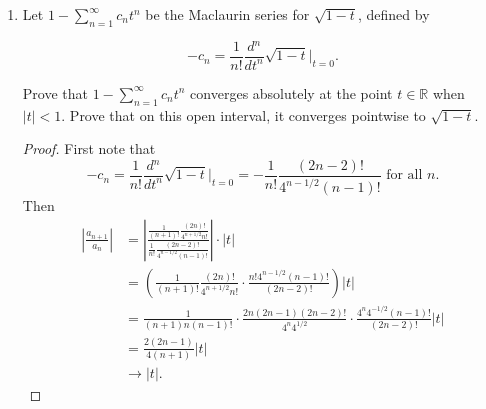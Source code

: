 \documentclass[11pt,oneside,english]{amsart}
\theoremstyle{definition}
\newcommand{\dd}[2]{\frac{d{#1}}{d{#2}}}
\newcommand{\MC}[1]{\mathcal{#1}}
\newcommand{\MB}[1]{\mathbb{#1}}
\def\<#1>{\mathinner{\langle#1\rangle}}
\begin{document}
\begin{enumerate}
\begin{proof}
Let $\<\pi_\gamma(x_{i(j)})>_{j\in J}\subseteq X_\gamma$ be a net. Since $X_\gamma$ is compact, by Theorem 4.29, the net $\<\pi_\gamma(x_{i(j)})>_{j\in J}$ has a subnet $\<\pi_\gamma(x_{i(j(k))})>_{k\in K\subseteq J}$ that converges to some point $p_\gamma$. Now, let $q$ be the unique element of
\[
\prod_{\alpha\in\overline{B}\cup\{\gamma\}}X_\alpha
\]
that extends both $\bar{p}$ and $p_\gamma$, i.e. the unique element such that $q\geq \bar{p},p_\gamma$. Then the net $\<\pi_{\overline{B}\cup\{\gamma\}}(x_{i(j(k))})>_{k\in K}$ converges to $q$. But this means that $q$ is a cluster point of the net $\<\pi_{\overline{B}\cup\{\gamma\}}(x_i)>$, i.e. $q\in\MC{P}$ and $q\geq\bar{p}$, but $q\neq\bar{p}$, a contradiction. Therefore, our assumption that $\overline{B}\neq A$ was fallacious and it must be the case that $\overline{B}=A$. Consequently, $\bar{p}$ is a cluster point of our original net $\<x_i>$, and since $\<x_i>$ was chosen arbitrarily, we have shown that any net in $X$ has a cluster point. By Proposition 4.29 again, this means that $X$ is compact, and we are done.
\end{proof}


\item Let $\displaystyle 1-\sum_{n=1}^\infty c_nt^n$ be the Maclaurin series for $\sqrt{1-t}$, defined by

\[
-c_n=\frac{1}{n!}\dd{^n}{t^n}\sqrt{1-t}\Bigg|_{t=0}.
\]

Prove that $\displaystyle 1-\sum_{n=1}^\infty c_nt^n$ converges absolutely at the point $t\in\MB{R}$ when $|t|<1$. Prove that on this open interval, it converges pointwise to $\sqrt{1-t}$.

\begin{proof}
First note that 
\[
-c_n=\frac{1}{n!}\dd{^n}{t^n}\sqrt{1-t}\Bigg|_{t=0}=-\frac{1}{n!}\frac{(2n-2)!}{4^{n-1/2}(n-1)!}\text{ for all $n$.}
\]
Then 
\begin{align*}
\left|\frac{a_{n+1}}{a_n}\right|&=\left|\frac{\frac{1}{(n+1)!}\frac{(2n)!}{4^{n+1/2}n!}}{\frac{1}{n!}\frac{(2n-2)!}{4^{n-1/2}(n-1)!}}\right|\cdot |t|\\[2mm]
&=\left(\frac{1}{(n+1)!}\frac{(2n)!}{4^{n+1/2}n!}\cdot\frac{n!4^{n-1/2}(n-1)!}{(2n-2)!}\right)|t|\\[2mm]
&=\frac{1}{(n+1)n(n-1)!}\cdot\frac{2n(2n-1)(2n-2)!}{4^n4^{1/2}}\cdot\frac{4^n4^{-1/2}(n-1)!}{(2n-2)!}|t|\\[2mm]
&=\frac{2(2n-1)}{4(n+1)}|t|\\[2mm]
&\rightarrow|t|.
\end{align*}


\end{proof}
\end{enumerate}
\end{document}
